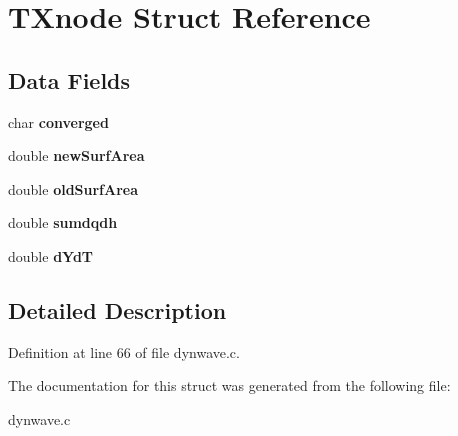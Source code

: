 \hypertarget{struct_t_xnode}{}\section{T\+Xnode Struct Reference}
\label{struct_t_xnode}
\subsection*{Data Fields}
\begin{DoxyCompactItemize}
\item 
\mbox{\label{struct_t_xnode_a90b3e5fe0f04c14aa31f9e1b88ae1a71}} 
char {\bfseries converged}
\item 
\mbox{\label{struct_t_xnode_a92ad0e6a8f36d22a29fcad9893490bae}} 
double {\bfseries new\+Surf\+Area}
\item 
\mbox{\label{struct_t_xnode_ab9dfef631b21597070e067308e25f494}} 
double {\bfseries old\+Surf\+Area}
\item 
\mbox{\label{struct_t_xnode_a03293b3f6c409cd99e53f3d0ad8a1565}} 
double {\bfseries sumdqdh}
\item 
\mbox{\label{struct_t_xnode_a9256266e65019d1ae64b4218e45f57ac}} 
double {\bfseries d\+YdT}
\end{DoxyCompactItemize}


\subsection{Detailed Description}


Definition at line 66 of file dynwave.\+c.



The documentation for this struct was generated from the following file\+:\begin{DoxyCompactItemize}
\item 
dynwave.\+c\end{DoxyCompactItemize}
